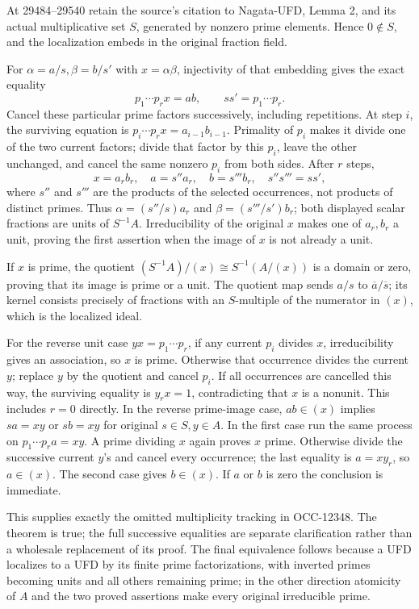 At 29484--29540 retain the source's citation to Nagata-UFD, Lemma 2, and its actual multiplicative set \(S\), generated by nonzero prime elements. Hence \(0\notin S\), and the localization embeds in the original fraction field.

For \(\alpha=a/s,\beta=b/s'\) with \(x=\alpha\beta\), injectivity of that embedding gives the exact equality \[
 p_1\cdots p_r x=ab,\qquad ss'=p_1\cdots p_r.
\] Cancel these particular prime factors successively, including repetitions. At step \(i\), the surviving equation is \(p_i\cdots p_r x=a_{i-1}b_{i-1}\). Primality of \(p_i\) makes it divide one of the two current factors; divide that factor by this \(p_i\), leave the other unchanged, and cancel the same nonzero \(p_i\) from both sides. After \(r\) steps, \[
 x=a_r b_r,\quad a=s''a_r,\quad b=s'''b_r,\quad s''s'''=ss',
\] where \(s''\) and \(s'''\) are the products of the selected occurrences, not products of distinct primes. Thus \(\alpha=(s''/s)a_r\) and \(\beta=(s'''/s')b_r\); both displayed scalar fractions are units of \(S^{-1}A\). Irreducibility of the original \(x\) makes one of \(a_r,b_r\) a unit, proving the first assertion when the image of \(x\) is not already a unit.

If \(x\) is prime, the quotient \((S^{-1}A)/(x)\cong S^{-1}(A/(x))\) is a domain or zero, proving that its image is prime or a unit. The quotient map sends \(a/s\) to \(\overline a/\overline s\); its kernel consists precisely of fractions with an \(S\)-multiple of the numerator in \((x)\), which is the localized ideal.

For the reverse unit case \(yx=p_1\cdots p_r\), if any current \(p_i\) divides \(x\), irreducibility gives an association, so \(x\) is prime. Otherwise that occurrence divides the current \(y\); replace \(y\) by the quotient and cancel \(p_i\). If all occurrences are cancelled this way, the surviving equality is \(y_r x=1\), contradicting that \(x\) is a nonunit. This includes \(r=0\) directly. In the reverse prime-image case, \(ab\in(x)\) implies \(sa=xy\) or \(sb=xy\) for original \(s\in S,y\in A\). In the first case run the same process on \(p_1\cdots p_r a=xy\). A prime dividing \(x\) again proves \(x\) prime. Otherwise divide the successive current \(y\)'s and cancel every occurrence; the last equality is \(a=xy_r\), so \(a\in(x)\). The second case gives \(b\in(x)\). If \(a\) or \(b\) is zero the conclusion is immediate.

This supplies exactly the omitted multiplicity tracking in OCC-12348. The theorem is true; the full successive equalities are separate clarification rather than a wholesale replacement of its proof. The final equivalence follows because a UFD localizes to a UFD by its finite prime factorizations, with inverted primes becoming units and all others remaining prime; in the other direction atomicity of \(A\) and the two proved assertions make every original irreducible prime.

